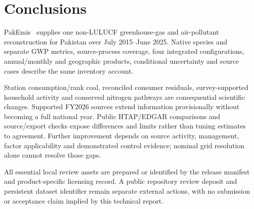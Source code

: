 \section{Conclusions}\label{sec:conclusion}
PakEmis \PakEmisRelease\ supplies one non-LULUCF greenhouse-gas and air-pollutant reconstruction for Pakistan over July 2015--June 2025. Native species and separate GWP metrics, source-process coverage, four integrated configurations, annual/monthly and geographic products, conditional uncertainty and source cases describe the same inventory account.

Station consumption/rank coal, reconciled consumer residuals, survey-supported household activity and conserved nitrogen pathways are consequential scientific changes. Supported FY2026 sources extend information provisionally without becoming a full national year. Public HTAP/EDGAR comparisons and source/export checks expose differences and limits rather than tuning estimates to agreement. Further improvement depends on source activity, management, factor applicability and demonstrated control evidence; nominal grid resolution alone cannot resolve those gaps.

All essential local review assets are prepared or identified by the release manifest and product-specific licensing record. A public repository review deposit and persistent dataset identifier remain separate external actions, with no submission or acceptance claim implied by this technical report.
